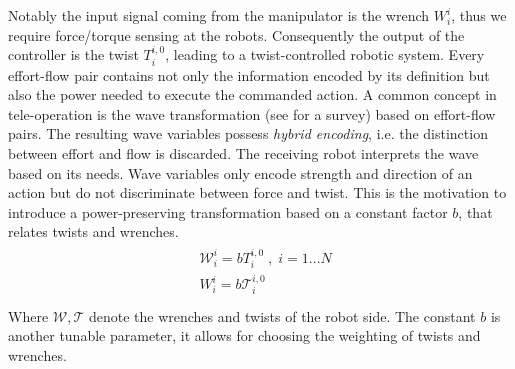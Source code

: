 \documentclass[a4paper,twoside, openright,12pt]{report}
\begin{document}
Notably the input signal coming from the manipulator is the wrench $W_i^i$, thus we require force/torque sensing at the robots. Consequently the output of the controller is the twist $T_i^{i,0}$, leading to a twist-controlled robotic system. Every effort-flow pair contains not only the information encoded by its definition but also the power needed to execute the commanded action. A common concept in tele-operation is the wave transformation (see \cite{Niemeyer_04} for a survey) based on effort-flow pairs. The resulting wave variables possess \emph{hybrid encoding}, i.e. the distinction between effort and flow is discarded. The receiving robot interprets the wave based on its needs. Wave variables only encode strength and direction of an action but do not discriminate between force and twist.
This is the motivation to introduce a power-preserving transformation based on a constant factor $b$, that relates twists and wrenches.
\begin{eqnarray}
\begin{aligned}
&\mathcal{W}_i^i = b T_i^{i,0} \; , \; i=1...N\\
&W_i^i = b \mathcal{T}_i^{i,0} \\
\end{aligned}
\end{eqnarray}
Where $\mathcal{W},\mathcal{T}$ denote the wrenches and twists of the robot side.
The constant $b$ is another tunable parameter, it allows for choosing the weighting of twists and wrenches.
\end{document}
